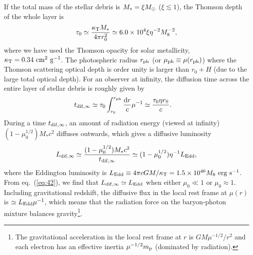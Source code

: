 \documentclass[useAMS,usenatbib]{mn2e}
\def\d{{\mathrm{d}}}
\begin{document}
If the total mass of the stellar debris is $M_{*} = \xi M_{\rm \odot}$
($\xi\lesssim1$), the Thomson depth of the whole layer is
\begin{equation}
  \label{eq:29}
  \tau_0 \simeq \frac{\kappa_{\rm T}M_{*}}{4\pi r_0^2} \simeq
  6.0\times 10^4 \xi \eta^{-2} M_8^{-2},
\end{equation}
where we have used the Thomson opacity for solar metallicity,
$\kappa_{\rm T} = 0.34\rm\ cm^2\ g^{-1}$. The photospheric radius
$r_{\rm ph}$ (or $\mu_{\rm ph}\equiv \mu(r_{\rm ph})$) where the Thomson 
scattering optical depth is order unity is larger than $r_0+H$ (due to
the large total optical depth). For an observer at infinity, the
diffusion time across the entire layer of stellar debris is roughly
given by
\begin{equation}
  \label{eq:30}
  \begin{split}
      t_{\rm dif,\infty} &\simeq \tau_0 \int_{r_0}^{r_{\rm
      ph}}\frac{\d r}{c}\mu^{-1} \simeq \frac{\tau_0 \eta r_{\rm
      S}}{c}.
  \end{split}
\end{equation}
During a time $t_{\rm dif,\infty}$, an amount of radiation energy
(viewed at infinity) $(1- \mu_0^{1/2})M_*c^2$ diffuses outwards, which gives
a diffusive luminosity
\begin{equation}
  \label{eq:42}
  L_{\rm dif, \infty} \simeq \frac{(1- \mu_0^{1/2})M_*c^2}{t_{\rm
      dif,\infty}} \simeq (1- \mu_0^{1/2}) \eta^{-1} L_{\rm Edd},
\end{equation}
where the Eddington luminosity is $L_{\rm
  Edd}\equiv 4\pi c G M/\kappa_{\rm T} = 1.5\times10^{46}M_8\rm\ erg\
s^{-1}$. From eq.~(\ref{eq:42}), we find that $L_{\rm dif,\infty}\simeq
L_{\rm Edd}$ when either $\mu_0\ll1$ or
$\mu_0\approx1$. Including gravitational redshift, the diffusive
flux in the local rest frame at $\mu(r)$ is $\simeq L_{\rm
  Edd}\mu^{-1}$, which means that the radiation 
force on the baryon-photon mixture balances gravity\footnote{The
  gravitational acceleration in the local rest frame at $r$ is
  $GM\mu^{-1/2}/r^2$ and each electron has an effective inertia
  $\mu^{-1/2} m_{\rm p}$ (dominated by radiation).}.
\end{document}
